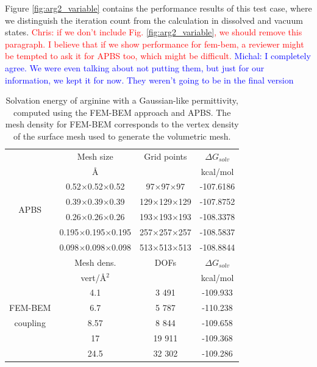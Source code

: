 Figure \ref{fig:arg2_variable} contains the performance results of this test case, where we distinguish the iteration count from the calculation in dissolved and vacuum states. \textcolor{red}{Chris: if we don't include Fig. \ref{fig:arg2_variable}, we should remove this paragraph. I believe that if we show performance for fem-bem, a reviewer might be tempted to ask it for APBS too, which might be difficult.}  \textcolor{blue}{Michal: I completely agree. We were even talking about not putting them, but just for our information, we kept it for now. They weren't going to be in the final version}
\begin{table}
\centering
\begin{tabular}{c|c|c|c}
&Mesh size  & Grid points & $\Delta G_{solv}$\\
&\AA       & &  kcal/mol \\
\hline
\multirow{4}{*}{APBS}& 0.52$\times$0.52$\times$0.52 & 97$\times$97$\times$97 & -107.6186 \\ 
& 0.39$\times$0.39$\times$0.39 & 129$\times$129$\times$129 & -107.8752\\ 
&0.26$\times$0.26$\times$0.26 & 193$\times$193$\times$193& -108.3378\\ 
&0.195$\times$0.195$\times$0.195 & 257$\times$257$\times$257& -108.5837\\ 
&0.098$\times$0.098$\times$0.098 & 513$\times$513$\times$513& -108.8844\\ 
\hline
&Mesh dens. & DOFs & $\Delta G_{solv}$\\
&vert/\AA$^2$   &  &  kcal/mol \\
\hline
    & 4.1 & 3 491 & -109.933 \\
FEM-BEM    & 6.7  & 5 787 & -110.238 \\
coupling    & 8.57  & 8 844 & -109.658 \\
    & 17 & 19 911 & -109.368 \\
    & 24.5 & 32 302 & -109.286 \\
\hline
\end{tabular}
\caption{Solvation energy of arginine with a Gaussian-like permittivity, computed using the FEM-BEM approach and APBS. The mesh density for FEM-BEM corresponds to the vertex density of the surface mesh used to generate the volumetric mesh.}
\label{table:arg_variable}
\end{table}

